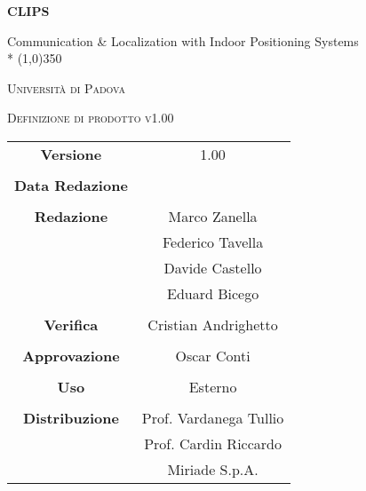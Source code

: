 \documentclass[a4paper,12pt]{article}
\author{}
\date{03/03/2016}
\begin{document}
\begin{titlepage}
	\centering
	{\huge\bfseries CLIPS\par}
	Communication \& Localization with Indoor Positioning Systems \\*
	\line(1,0){350} \\
	{\scshape\LARGE Università di Padova \par}
	\vspace{1cm}
	{\scshape\Large Definizione di prodotto v1.00\par}
	\logo
	\newpage
		\begin{tabular}{c|c}
			{\hfill \textbf{Versione}} 			& 1.00				\\ \\
			{\hfill\textbf{Data Redazione}} 	&            		\\ \\
			{\hfill\textbf{Redazione}} 			& Marco Zanella \\
												& Federico Tavella \\
												& Davide Castello \\
												& Eduard Bicego 	\\ \\
			{\hfill\textbf{Verifica}} 			& Cristian Andrighetto \\ \\
			{\hfill\textbf{Approvazione}} 		& Oscar Conti		\\ \\
			{\hfill\textbf{Uso}} 				& Esterno			\\ \\
			{\hfill\textbf{Distribuzione}} 		& Prof. Vardanega Tullio \\
												& Prof. Cardin Riccardo \\
												& Miriade S.p.A. \\
		\end{tabular}
	\end{titlepage}
	
	\newpage
	\pagestyle{myfront}
		
	\newpage
		\tableofcontents
	\newpage
		\listoffigures	
	\label{LastFrontPage}
	\newpage
	
	\pagestyle{mymain}
	
	\newpage
		
		
	\newpage
		
		
	\newpage
			
		
	\newpage
		
		
	\newpage
		
		
	\newpage
		
		
		
	\label{LastPage}
\end{document}

